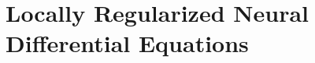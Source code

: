 \chapter{Locally Regularized Neural Differential Equations}
\label{chapter:local_regularized_neural_des}


